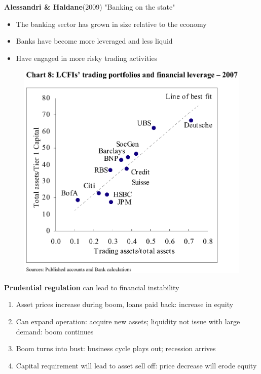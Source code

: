 \documentclass{beamer}
\begin{document}
\begin{frame}
  \textbf{Alessandri \& Haldane}(2009) "Banking on the state"
\begin{itemize}
  \item The banking sector has grown in size relative to the economy
  \item Banks have become more leveraged and less liquid
  \item Have engaged in more risky trading activities
\end{itemize}
 \begin{figure}
   \includegraphics[scale=.4]{bank_state.eps}
 \end{figure}
\end{frame}

\begin{frame}
 \textbf{Prudential regulation} can lead to financial instability
  \begin{enumerate}
  \item Asset prices increase during boom, loans paid back: increase in equity
  \item Can expand operation: acquire new assets; liquidity not issue with large demand: boom continues
  \item Boom turns into bust: business cycle plays out; recession arrives
  \item Capital requirement will lead to asset sell off: price decrease will erode equity
\end{enumerate}
\end{frame}
\end{document}
